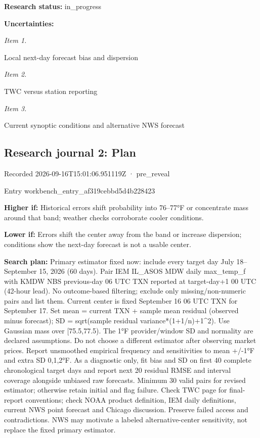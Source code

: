 \documentclass[11pt]{article}
\begin{document}
\par\noindent\textbf{Research status:} in\_progress

\par\noindent\textbf{Uncertainties:} \par \par\noindent\textit{Item 1.}\par Local next-day forecast bias and dispersion

\par\noindent\textit{Item 2.}\par TWC versus station reporting

\par\noindent\textit{Item 3.}\par Current synoptic conditions and alternative NWS forecast

\subsection*{\textcolor{epdarkgreen}{Research journal 2: Plan}}
Recorded 2026-09-16T15:01:06.951119Z · pre\_reveal


Entry workbench\_en\hspace{0pt}try\_af319ceb\hspace{0pt}bd5d4b228423


\par\noindent\textbf{Higher if:} Historical errors shift probability into 76–77°F or concentrate mass around that band; weather checks corroborate cooler conditions.

\par\noindent\textbf{Lower if:} Errors shift the center away from the band or increase dispersion; conditions show the next-day forecast is not a usable center.

\par\noindent\textbf{Search plan:} Primary estimator fixed now: include every target day July 18–September 15, 2026 (60 days). Pair IEM IL\_ASOS MDW daily max\_temp\_f with KMDW NBS previous-day 06 UTC TXN reported at target-day+1 00 UTC (42-hour lead). No outcome-based filtering; exclude only missing/non-numeric pairs and list them. Current center is fixed September 16 06 UTC TXN for September 17. Set mean = current TXN + sample mean residual (observed minus forecast); SD = sqrt(sample residual variance*(1+1/n)+1\textasciicircum{}2). Use Gaussian mass over [75.5,77.5). The 1°F provider/window SD and normality are declared assumptions. Do not choose a different estimator after observing market prices. Report unsmoothed empirical frequency and sensitivities to mean +/-1°F and extra SD 0,1,2°F. As a diagnostic only, fit bias and SD on first 40 complete chronological target days and report next 20 residual RMSE and interval coverage alongside unbiased raw forecasts. Minimum 30 valid pairs for revised estimator; otherwise retain initial and flag failure. Check TWC page for final-report conventions; check NOAA product definition, IEM daily definitions, current NWS point forecast and Chicago discussion. Preserve failed access and contradictions. NWS may motivate a labeled alternative-center sensitivity, not replace the fixed primary estimator.
\end{document}
